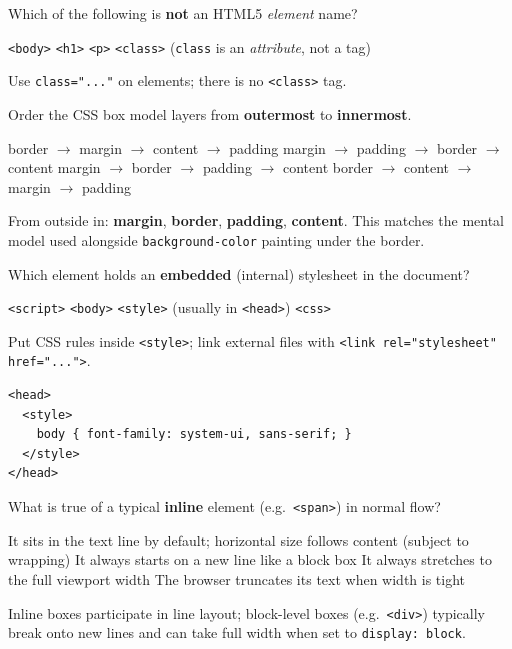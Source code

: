 \question[4]
Which of the following is \textbf{not} an HTML5 \emph{element} name?
\begin{choices}
  \choice \texttt{<body>}
  \choice \texttt{<h1>}
  \choice \texttt{<p>}
  \CorrectChoice \texttt{<class>} (\texttt{class} is an \emph{attribute}, not a tag)
\end{choices}
\begin{solution}
  Use \texttt{class="..."} on elements; there is no \texttt{<class>} tag.
\end{solution}

\question[4]
Order the CSS box model layers from \textbf{outermost} to \textbf{innermost}.
\begin{choices}
  \choice border $\rightarrow$ margin $\rightarrow$ content $\rightarrow$ padding
  \choice margin $\rightarrow$ padding $\rightarrow$ border $\rightarrow$ content
  \CorrectChoice margin $\rightarrow$ border $\rightarrow$ padding $\rightarrow$ content
  \choice border $\rightarrow$ content $\rightarrow$ margin $\rightarrow$ padding
\end{choices}
\begin{solution}
  From outside in: \textbf{margin}, \textbf{border}, \textbf{padding}, \textbf{content}. This matches the mental model used alongside \texttt{background-color} painting under the border.
\end{solution}

\question[4]
Which element holds an \textbf{embedded} (internal) stylesheet in the document?
\begin{choices}
  \choice \texttt{<script>}
  \choice \texttt{<body>}
  \CorrectChoice \texttt{<style>} (usually in \texttt{<head>})
  \choice \texttt{<css>}
\end{choices}
\begin{solution}
  Put CSS rules inside \texttt{<style>}; link external files with \texttt{<link rel="stylesheet" href="...">}.
\begin{lstlisting}[style=htmlexam]
<head>
  <style>
    body { font-family: system-ui, sans-serif; }
  </style>
</head>
\end{lstlisting}
\end{solution}

\question[4]
What is true of a typical \textbf{inline} element (e.g.\ \texttt{<span>}) in normal flow?
\begin{choices}
  \CorrectChoice It sits in the text line by default; horizontal size follows content (subject to wrapping)
  \choice It always starts on a new line like a block box
  \choice It always stretches to the full viewport width
  \choice The browser truncates its text when width is tight
\end{choices}
\begin{solution}
  Inline boxes participate in line layout; block-level boxes (e.g.\ \texttt{<div>}) typically break onto new lines and can take full width when set to \texttt{display: block}.
\end{solution}

